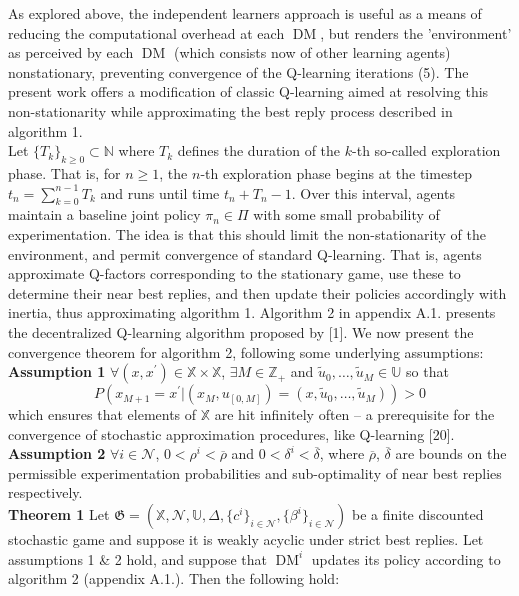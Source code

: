 \documentclass[10pt]{article}
\newcommand{\mbb}[1]{\mathbb{#1}}
\newcommand{\1}[1]{\mathbbm{1}_{#1}}
\newcommand{\mc}[1]{\mathcal{#1}}
\DeclareMathOperator{\DM}{DM}
\begin{document}
As explored above, the independent learners approach is useful as a means of reducing the computational overhead at each $\DM$, but renders the 'environment' as perceived by each $\DM$ (which consists now of other learning agents) nonstationary, preventing convergence of the Q-learning iterations (5). The present work offers a modification of classic Q-learning aimed at resolving this non-stationarity while approximating the best reply process described in algorithm 1.\\[5pt]
Let $\{T_k\}_{k\geq 0}\subset\mbb{N}$ where $T_k$ defines the duration of the $k$-th so-called exploration phase. That is, for $n\geq 1$, the $n$-th exploration phase begins at the timestep $t_n=\sum_{k=0}^{n-1}T_k$ and runs until time $t_n+T_n-1$. Over this interval, agents maintain a baseline joint policy $\pi_n\in\Pi$ with some small probability of experimentation. The idea is that this should limit the non-stationarity of the environment, and permit convergence of standard Q-learning.
That is, agents approximate Q-factors corresponding to the stationary game, use these to determine their near best replies, and then update their policies accordingly with inertia, thus approximating algorithm 1.
Algorithm 2 in appendix A.1. presents the decentralized Q-learning algorithm proposed by [1]. We now present the convergence theorem for algorithm 2, following some underlying assumptions:\\[5pt]
{\bf Assumption 1}\hspace{5pt} $\forall (x,x^\prime)\in\mbb{X}\times\mbb{X}$, $\exists M\in\mbb{Z}_+$ and $\tilde{u}_0,\dots,\tilde{u}_M\in\mbb{U}$ so that
\[P(x_{M+1}=x^\prime|(x_M,u_{[0,M]})=(x,\tilde{u}_0,\dots,\tilde{u}_M))>0\]
which ensures that elements of $\mbb{X}$ are hit infinitely often -- a prerequisite for the convergence of stochastic approximation procedures, like Q-learning [20].\\[5pt]
{\bf Assumption 2}\hspace{5pt} $\forall i\in\mc{N}$, $0<\rho^i<\overline{\rho}$ and $0<\delta^i<\overline{\delta}$, where $\overline{\rho}$, $\overline{\delta}$ are bounds on the permissible
experimentation probabilities and sub-optimality of near best replies respectively.\\[5pt]
{\bf Theorem 1}\hspace{5pt} Let $\mathfrak{G}=(\mbb{X},\mc{N},\mbb{U},\Delta,\{c^i\}_{i\in\mc{N}},\{\beta^i\}_{i\in\mc{N}})$ be a finite discounted stochastic game and suppose it is weakly acyclic under strict best replies.
Let assumptions 1 \& 2 hold, and suppose that $\DM^i$ updates its policy according to algorithm 2 (appendix A.1.). Then the following hold:\\[5pt]
\end{document}

